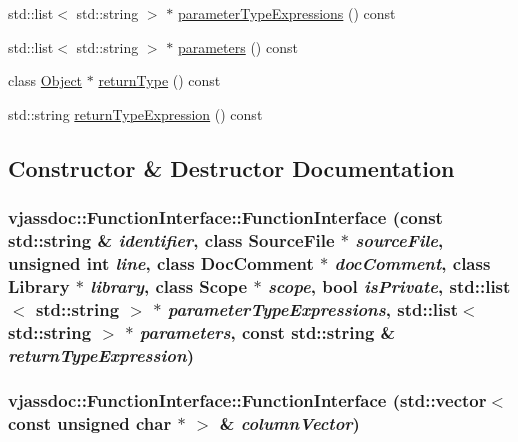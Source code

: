 \begin{CompactItemize}
\item 
std::list$<$ std::string $>$ $\ast$ \hyperlink{classvjassdoc_1_1FunctionInterface_5a4199aa5d1aae02b27bb41d76e2dc70}{parameterTypeExpressions} () const 
\item 
std::list$<$ std::string $>$ $\ast$ \hyperlink{classvjassdoc_1_1FunctionInterface_93f6d443529b9f3bb2f9ed679b4dc97a}{parameters} () const 
\item 
class \hyperlink{classvjassdoc_1_1Object}{Object} $\ast$ \hyperlink{classvjassdoc_1_1FunctionInterface_5ad6508146fcb9e7c8accf22a0e4d563}{returnType} () const 
\item 
std::string \hyperlink{classvjassdoc_1_1FunctionInterface_951b692881136d487bb89b1dce203f08}{returnTypeExpression} () const 
\end{CompactItemize}


\subsection{Constructor \& Destructor Documentation}
\hypertarget{classvjassdoc_1_1FunctionInterface_0cfa512a726b2d035b42f783d02d6b63}{
\subsubsection{\setlength{\rightskip}{0pt plus 5cm}vjassdoc::FunctionInterface::FunctionInterface (const std::string \& {\em identifier}, class {\bf SourceFile} $\ast$ {\em sourceFile}, unsigned int {\em line}, class {\bf DocComment} $\ast$ {\em docComment}, class {\bf Library} $\ast$ {\em library}, class {\bf Scope} $\ast$ {\em scope}, bool {\em isPrivate}, std::list$<$ std::string $>$ $\ast$ {\em parameterTypeExpressions}, std::list$<$ std::string $>$ $\ast$ {\em parameters}, const std::string \& {\em returnTypeExpression})}}
\label{classvjassdoc_1_1FunctionInterface_0cfa512a726b2d035b42f783d02d6b63}


\hypertarget{classvjassdoc_1_1FunctionInterface_0eae365567f49506b31b3f8c860550f2}{
\subsubsection{\setlength{\rightskip}{0pt plus 5cm}vjassdoc::FunctionInterface::FunctionInterface (std::vector$<$ const unsigned char $\ast$ $>$ \& {\em columnVector})}}
\label{classvjassdoc_1_1FunctionInterface_0eae365567f49506b31b3f8c860550f2}


